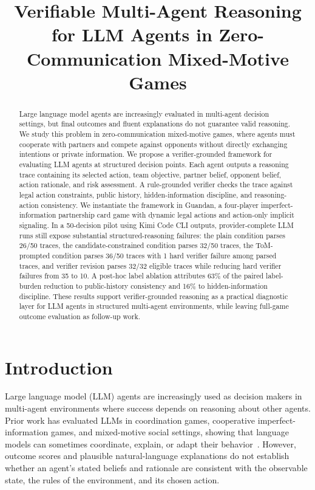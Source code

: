 \documentclass[sigconf,anonymous,review]{acmart}
\title{Verifiable Multi-Agent Reasoning for LLM Agents in Zero-Communication Mixed-Motive Games}
\begin{document}
\begin{abstract}
Large language model agents are increasingly evaluated in multi-agent decision settings, but final outcomes and fluent explanations do not guarantee valid reasoning. We study this problem in zero-communication mixed-motive games, where agents must cooperate with partners and compete against opponents without directly exchanging intentions or private information. We propose a verifier-grounded framework for evaluating LLM agents at structured decision points. Each agent outputs a reasoning trace containing its selected action, team objective, partner belief, opponent belief, action rationale, and risk assessment. A rule-grounded verifier checks the trace against legal action constraints, public history, hidden-information discipline, and reasoning-action consistency. We instantiate the framework in Guandan, a four-player imperfect-information partnership card game with dynamic legal actions and action-only implicit signaling. In a 50-decision pilot using Kimi Code CLI outputs, provider-complete LLM runs still expose substantial structured-reasoning failures: the plain condition parses 26/50 traces, the candidate-constrained condition parses 32/50 traces, the ToM-prompted condition parses 36/50 traces with 1 hard verifier failure among parsed traces, and verifier revision parses 32/32 eligible traces while reducing hard verifier failures from 35 to 10. A post-hoc label ablation attributes 63\% of the paired label-burden reduction to public-history consistency and 16\% to hidden-information discipline. These results support verifier-grounded reasoning as a practical diagnostic layer for LLM agents in structured multi-agent environments, while leaving full-game outcome evaluation as follow-up work.
\end{abstract}


\maketitle

\section{Introduction}

Large language model (LLM) agents are increasingly used as decision makers in multi-agent environments where success depends on reasoning about other agents. Prior work has evaluated LLMs in coordination games, cooperative imperfect-information games, and mixed-motive social settings, showing that language models can sometimes coordinate, explain, or adapt their behavior~\citep{agashe2023llmcoordination,ramesh2026hanabi,xie2026m3bench}. However, outcome scores and plausible natural-language explanations do not establish whether an agent's stated beliefs and rationale are consistent with the observable state, the rules of the environment, and its chosen action.
\end{document}
